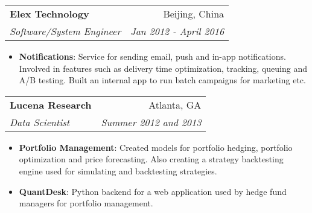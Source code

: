 \documentclass[letterpaper,11pt]{article}
\makeatletter
\newcommand{\resumeItem}[2]{
  \item\small{
    \textbf{#1}{: #2 \vspace{-2pt}}
  }
}
\newcommand{\resumeSubheading}[4]{
  \vspace{-1pt}\item
    \begin{tabular*}{0.97\textwidth}[t]{l@{\extracolsep{\fill}}r}
      \textbf{#1} & #2 \\
      \textit{\small#3} & \textit{\small #4} \\
    \end{tabular*}\vspace{-5pt}
}
\newcommand{\resumeItemListStart}{\begin{itemize}}
\newcommand{\resumeItemListEnd}{\end{itemize}\vspace{-5pt}}
\makeatother
\begin{document}
    \resumeSubheading
      {Elex Technology}{Beijing, China}
      {Software/System Engineer}{Jan 2012 - April 2016}
      \resumeItemListStart
        \resumeItem{Notifications}
          {Service for sending email, push and in-app notifications. Involved in features such as delivery time optimization, tracking, queuing and A/B testing. Built an internal app to run batch campaigns for marketing etc.}
      \resumeItemListEnd

    \resumeSubheading
      {Lucena Research}{Atlanta, GA}
      {Data Scientist}{Summer 2012 and 2013}
      \resumeItemListStart
        \resumeItem{Portfolio Management}
          {Created models for portfolio hedging,  portfolio optimization and price forecasting. Also creating a strategy backtesting engine used for simulating and backtesting strategies.}
        \resumeItem{QuantDesk}
          {Python backend for a web application used by hedge fund managers for portfolio management.}
      \resumeItemListEnd
\end{document}
